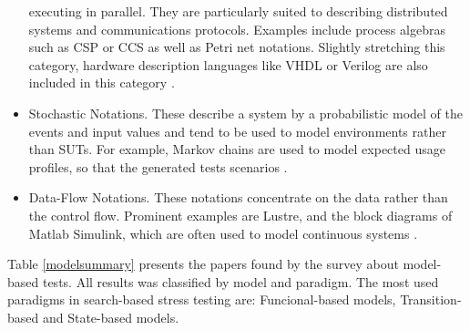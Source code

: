 \documentclass{report}
\begin{document}
\begin{itemize}
executing in parallel. They are particularly suited to describing distributed systems and
communications protocols. Examples include process algebras such as CSP or CCS as well as
Petri net notations. Slightly stretching this category, hardware description languages like VHDL
or Verilog are also included in this category \cite{MarkUtting2012}.
\item Stochastic Notations. These describe a system by a probabilistic model of the events and input
values and tend to be used to model environments rather than SUTs. For example, Markov chains
are used to model expected usage profiles, so that the generated tests scenarios \cite{MarkUtting2012}.
\item Data-Flow Notations. These notations concentrate on the data rather than the control flow.
Prominent examples are Lustre, and the block diagrams of Matlab Simulink, which are often used
to model continuous systems \cite{MarkUtting2012}.
\end{itemize}


Table \ref{modelsummary} presents the papers found by the survey about model-based tests. All results was classified by model and paradigm. The most used paradigms in search-based stress testing are:  Funcional-based models, Transition-based and State-based models. 
\end{document}
